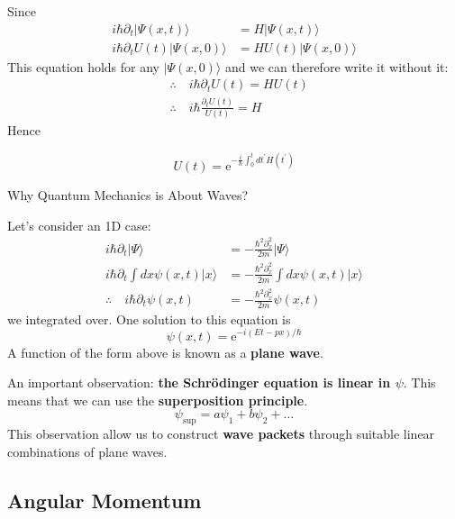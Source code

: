Since
$$
\begin{aligned}
i \hbar \partial_{t}|\Psi(x, t)\rangle &= H|\Psi(x, t)\rangle \\
i \hbar \partial_{t} U(t)|\Psi(x, 0)\rangle &= H U(t)|\Psi(x, 0)\rangle
\end{aligned}
$$
This equation holds for any $|\Psi(x, 0)\rangle$ and we can therefore write it without it:
$$
\begin{aligned}
&\therefore \quad i \hbar \partial_{t} U(t)=H U(t)\\
&\therefore \quad i \hbar \frac{\partial_{t} U(t)}{U(t)}=H
\end{aligned}
$$
Hence
\begin{qt}
\begin{equation}
U(t)=\mathrm{e}^{-\frac{i}{\hbar} \int_{0}^{t} d t^{\prime} H\left(t^{\prime}\right)}
\end{equation}
\end{qt}
\begin{mybox}
\begin{center}
    Why Quantum Mechanics is About Waves?
\end{center}
\end{mybox}
\begin{mybox2}
Let's consider an 1D case:
$$
\begin{aligned}
i \hbar \partial_{t}|\Psi\rangle &=-\frac{\hbar^{2} \partial_{x}^{2}}{2 m}|\Psi\rangle \\
i \hbar \partial_{t} \int d x \psi(x, t)|x\rangle &=-\frac{\hbar^{2} \partial_{x}^{2}}{2 m} \int d x \psi(x, t)|x\rangle \\
\therefore \quad i \hbar \partial_{t} \psi(x, t) &=-\frac{\hbar^{2} \partial_{x}^{2}}{2 m} \psi(x, t)
\end{aligned}
$$
we integrated over. One solution to this equation is
\begin{equation}
\psi(x, t)=\mathrm{e}^{-i(E t-p x) / \hbar}
\end{equation}
A function of the form above is known as a \textbf{plane wave}.
\end{mybox2}
An important observation: \textbf{the Schrödinger equation is linear in $\psi .$} This means that we can use the \textbf{superposition principle}.
\begin{equation}
\psi_{\mathrm{sup}}=a \psi_{1}+b \psi_{2}+\ldots
\end{equation}
This observation allow us to construct \textbf{wave packets} through suitable linear combinations of plane waves. 

\subsection{Angular Momentum}
